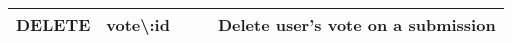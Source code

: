 \begin{table}[H]
\begin{tabular}{|l|l|l|l|l|}
    DELETE & vote\textbackslash{}:id                                                                         &                                                                                                                                                          &                                                                                                                     & Delete user's vote on a submission                                                                                                                          \\ \hline
    \end{tabular}
\end{table}